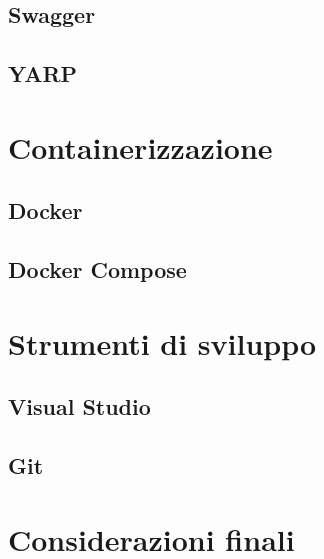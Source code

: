\subsection{Swagger}
\subsection{YARP}
\section{Containerizzazione}
\subsection{Docker}
\subsection{Docker Compose}
\section{Strumenti di sviluppo}
\subsection{Visual Studio}
\subsection{Git}
\section{Considerazioni finali}












%
%




